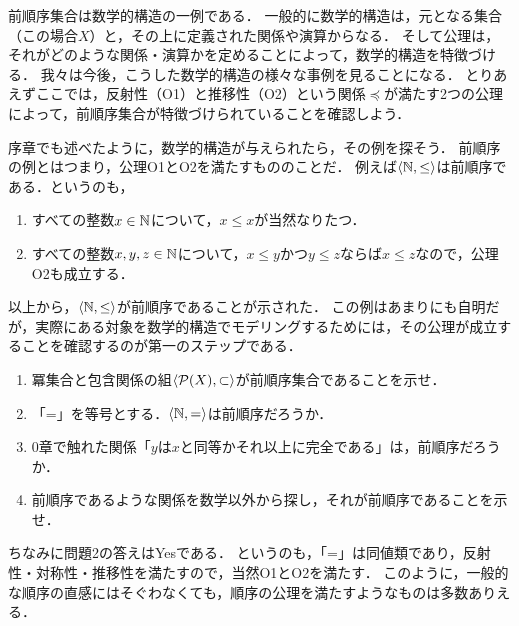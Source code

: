 \documentclass[11pt,a4paper]{jsarticle}
\begin{document}
前順序集合は数学的構造の一例である．
一般的に数学的構造は，元となる集合（この場合$X$）と，その上に定義された関係や演算からなる．
そして公理は，それがどのような関係・演算かを定めることによって，数学的構造を特徴づける．
我々は今後，こうした数学的構造の様々な事例を見ることになる．
とりあえずここでは，反射性（O1）と推移性（O2）という関係$\preceq$が満たす2つの公理によって，前順序集合が特徴づけられていることを確認しよう．

序章でも述べたように，数学的構造が与えられたら，その例を探そう．
前順序の例とはつまり，公理O1とO2を満たすもののことだ．
例えば$\langle \mathbb{N}, \leq \rangle$は前順序である．というのも，
\begin{enumerate}
 \item すべての整数$x \in \mathbb{N}$について，$x \leq x$が当然なりたつ．
 \item すべての整数$x, y, z \in \mathbb{N}$について，$x \leq y$かつ$y \leq z$ならば$x \leq z$なので，公理O2も成立する．
\end{enumerate}
以上から，$\langle \mathbb{N}, \leq \rangle$が前順序であることが示された．
この例はあまりにも自明だが，実際にある対象を数学的構造でモデリングするためには，その公理が成立することを確認するのが第一のステップである．

\begin{exercise}
\begin{enumerate}
 \item 冪集合と包含関係の組$\langle \mathcal{P}(X), \subset \rangle$が前順序集合であることを示せ． 
 \item 「=」を等号とする．$\langle \mathbb{N}, = \rangle$は前順序だろうか．
 \item 0章で触れた関係「$y$は$x$と同等かそれ以上に完全である」は，前順序だろうか．
 \item 前順序であるような関係を数学以外から探し，それが前順序であることを示せ．
\end{enumerate}
\end{exercise}

ちなみに問題2の答えはYesである．
というのも，「=」は同値類であり，反射性・対称性・推移性を満たすので，当然O1とO2を満たす．
このように，一般的な順序の直感にはそぐわなくても，順序の公理を満たすようなものは多数ありえる．
\end{document}
